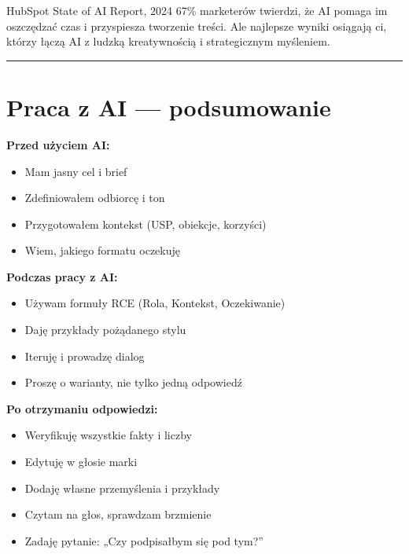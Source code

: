 \documentclass[
  12pt,
  a4paper,
  twoside,
  openright,
  12pt,
  DIV=12,
  BCOR=12mm]{scrbook}
\providecommand{\tightlist}{%
  \setlength{\itemsep}{0pt}\setlength{\parskip}{0pt}}\usepackage{longtable,booktabs,array}
\newcommand{\decoline}{%
  \begin{center}
    \textcolor{bordergray}{\rule{0.3\textwidth}{0.5pt}}
  \end{center}
}
\begin{document}
\begin{cytat}{HubSpot State of AI Report, 2024}
67\% marketerów twierdzi, że AI pomaga im oszczędzać czas i przyspiesza tworzenie treści. Ale najlepsze wyniki osiągają ci, którzy łączą AI z ludzką kreatywnością i strategicznym myśleniem.
\end{cytat}

\decoline

\section{Praca z AI --- podsumowanie}\label{praca-z-ai-podsumowanie}

\textbf{Przed użyciem AI:}

\begin{itemize}
\tightlist
\item[$\square$]
  Mam jasny cel i brief
\item[$\square$]
  Zdefiniowałem odbiorcę i ton
\item[$\square$]
  Przygotowałem kontekst (USP, obiekcje, korzyści)
\item[$\square$]
  Wiem, jakiego formatu oczekuję
\end{itemize}

\textbf{Podczas pracy z AI:}

\begin{itemize}
\tightlist
\item[$\square$]
  Używam formuły RCE (Rola, Kontekst, Oczekiwanie)
\item[$\square$]
  Daję przykłady pożądanego stylu
\item[$\square$]
  Iteruję i prowadzę dialog
\item[$\square$]
  Proszę o warianty, nie tylko jedną odpowiedź
\end{itemize}

\textbf{Po otrzymaniu odpowiedzi:}

\begin{itemize}
\tightlist
\item[$\square$]
  Weryfikuję wszystkie fakty i liczby
\item[$\square$]
  Edytuję w głosie marki
\item[$\square$]
  Dodaję własne przemyślenia i przykłady
\item[$\square$]
  Czytam na głos, sprawdzam brzmienie
\item[$\square$]
  Zadaję pytanie: „Czy podpisałbym się pod tym?''
\end{itemize}
\end{document}

